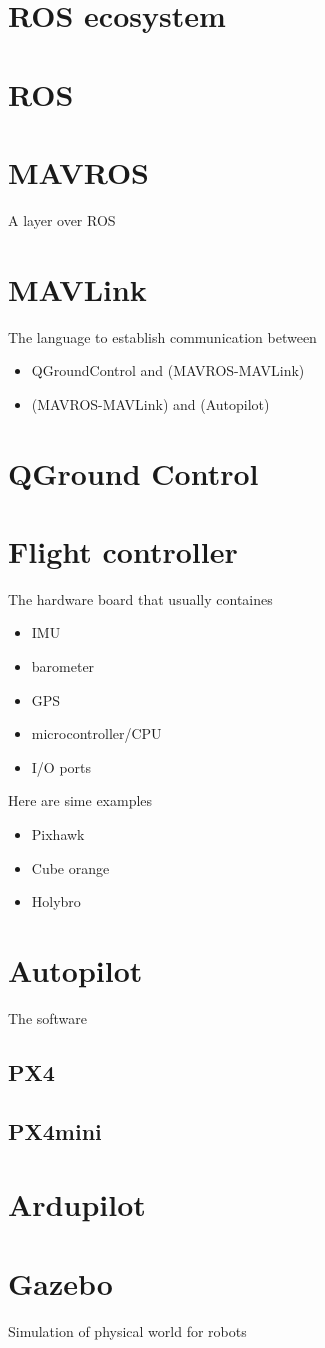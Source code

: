 \section{ROS ecosystem}

\section{ROS}

\section{MAVROS}
A layer over ROS

\section{MAVLink}
The language to establish communication between
    \begin{itemize}
        \item QGroundControl and (MAVROS-MAVLink)
        \item (MAVROS-MAVLink) and (Autopilot)
    \end{itemize}


\section{QGround Control}


\section{Flight controller}
The hardware board that usually containes
    \begin{itemize}
        \item IMU
        \item barometer
        \item GPS
        \item microcontroller/CPU
        \item I/O ports
    \end{itemize}

    Here are sime examples
    \begin{itemize}
        \item Pixhawk
        \item Cube orange
        \item Holybro
    \end{itemize}

\section{Autopilot}
The software
    \subsection{PX4}
    \subsection{PX4mini}
    \section{Ardupilot}

\section{Gazebo}
Simulation of physical world for robots